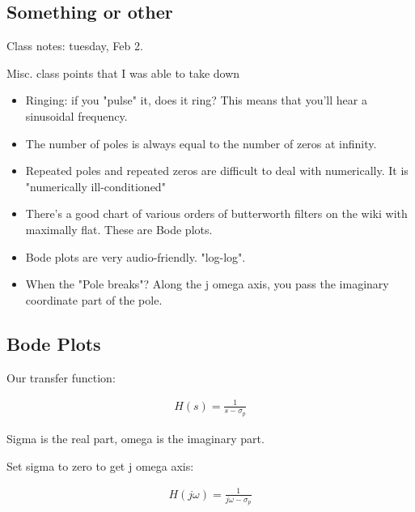 \subsection*{Something or other}
Class notes: tuesday, Feb 2.

Misc. class points that I was able to take down

\begin{itemize}

\item{Ringing: if you "pulse" it, does it ring? This means that you'll hear a sinusoidal frequency.}

\item{The number of poles is always equal to the number of zeros at infinity. }

\item{Repeated poles and repeated zeros are difficult to deal with numerically. It is "numerically ill-conditioned"}

\item{There's a good chart of various orders of butterworth filters on the wiki with maximally flat. 
These are Bode plots.}

\item{Bode plots are very audio-friendly. "log-log".}

\item{When the "Pole breaks"? Along the j omega axis, you pass the imaginary coordinate part of the pole.}

\end{itemize}

\subsection*{Bode Plots}
Our transfer function:

\begin{align*}
H(s) = \frac{1}{s - \sigma_p}
\end{align*}

Sigma is the real part, omega is the imaginary part. 

Set sigma to zero to get j omega axis:

\begin{align*}
H(j \omega ) = \frac{1}{j \omega - \sigma_p}
\end{align*}



